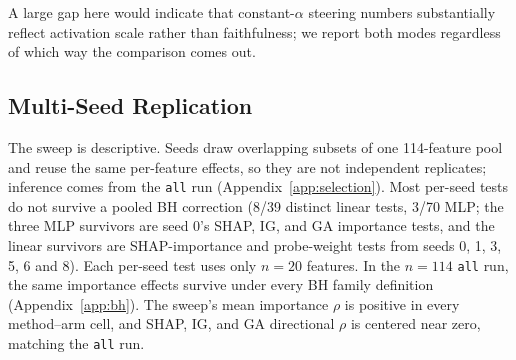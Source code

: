 A large gap here would indicate that constant-$\alpha$ steering numbers
substantially reflect activation scale rather than faithfulness; we report
both modes regardless of which way the comparison comes out.

\subsection{Multi-Seed Replication}
\label{app:seed-sweep}

The sweep is descriptive. Seeds draw overlapping subsets of one
114-feature pool and reuse the same per-feature effects, so they are not
independent replicates; inference comes from the \texttt{all} run
(Appendix~\ref{app:selection}). Most per-seed tests do not survive a pooled BH
correction (8/39 distinct linear tests, 3/70 MLP; the three MLP survivors are seed 0's
SHAP, IG, and GA importance tests, and the linear survivors are SHAP-importance and
probe-weight tests from seeds 0, 1, 3, 5, 6 and 8). Each per-seed
test uses only $n=20$ features. In the $n=114$ \texttt{all} run, the same
importance effects survive under every BH family definition
(Appendix~\ref{app:bh}). The sweep's mean importance $\rho$ is positive in
every method--arm cell, and SHAP, IG, and GA directional $\rho$ is centered near
zero, matching the \texttt{all} run.

